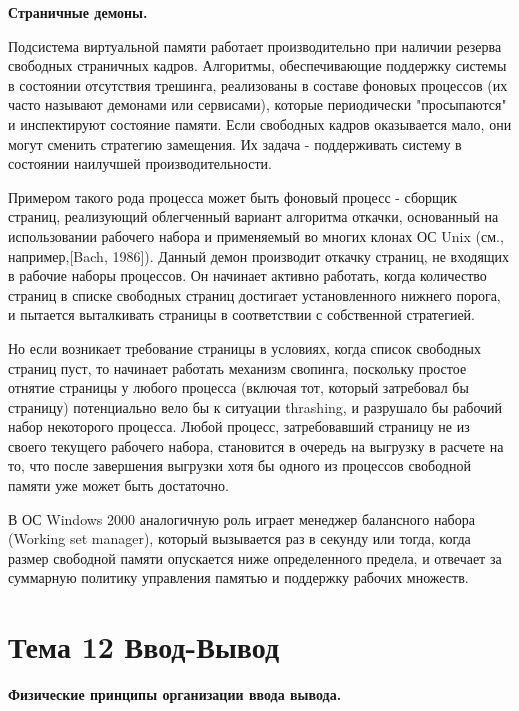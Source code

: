\begin{center}{\bfseries Страничные демоны.}
\end{center}

Подсистема виртуальной памяти работает производительно при наличии резерва свободных страничных кадров. Алгоритмы, обеспечивающие поддержку системы в состоянии отсутствия трешинга, реализованы в составе фоновых процессов (их часто называют демонами или сервисами), которые периодически "просыпаются" и инспектируют состояние памяти. Если свободных кадров оказывается мало, они могут сменить стратегию замещения. Их задача - поддерживать систему в состоянии наилучшей производительности. 

Примером такого рода процесса может быть фоновый процесс - сборщик страниц, реализующий облегченный вариант алгоритма откачки, основанный на использовании рабочего набора и применяемый во многих клонах ОС Unix (см., например,[Bach, 1986]). Данный демон производит откачку страниц, не входящих в рабочие наборы процессов. Он начинает активно работать, когда количество страниц в списке свободных страниц достигает установленного нижнего порога, и пытается выталкивать страницы в соответствии с собственной стратегией.

Но если возникает требование страницы в условиях, когда список свободных страниц пуст, то начинает работать механизм свопинга, поскольку простое отнятие страницы у любого процесса (включая тот, который затребовал бы страницу) потенциально вело бы к ситуации thrashing, и разрушало бы рабочий набор некоторого процесса. Любой процесс, затребовавший страницу не из своего текущего рабочего набора, становится в очередь на выгрузку в расчете на то, что после завершения выгрузки хотя бы одного из процессов свободной памяти уже может быть достаточно.

В ОС Windows 2000 аналогичную роль играет менеджер балансного набора (Working set manager), который вызывается раз в секунду или тогда, когда размер свободной памяти опускается ниже определенного предела, и отвечает за суммарную политику управления памятью и поддержку рабочих множеств.

\newpage 
\chapter{Тема 12 Ввод-Вывод}

\begin{center}{\bfseries Физические принципы организации ввода вывода.}
\end{center}

